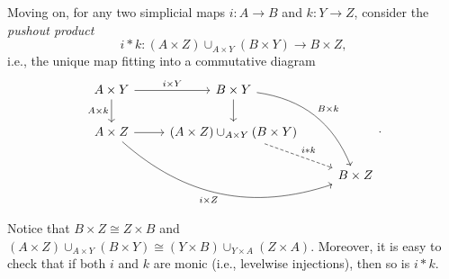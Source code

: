 \documentclass[10pt,letterpaper,cm]{nupset}
\theoremstyle{definition}
\theoremstyle{theorem}
\theoremstyle{remark}
\newcommand{\0}{\mathbf{0}}
\newcommand{\1}{\mathbf{1}}
\newcommand{\2}{\mathbf{2}}
\begin{document}
Moving on, for any two simplicial maps $i : A \to B$ and $k : Y \to Z$, consider the \textit{pushout product} 
\[
i \mathbin{\ast} k  : \left(A \times Z\right) \cup_{A\times Y} \left(B \times Y \right) \to B \times Z,
\] i.e., the unique map fitting into a commutative diagram
\[
\begin{tikzcd}
A\times Y \arrow[d, "A\times k"'] \arrow[r, "i\times Y"]  & B\times Y \arrow[d] \arrow[rdd, "B\times k", bend left]                                                   &           \\
A\times Z \arrow[r] \arrow[rrd, "i\times Z"', bend right] &  \left(A \times Z\right) \cup_{A\times Y} \left(B \times Y \right) \arrow[rd, "i\mathbin{\ast}k", dashed] &           \\
                                                          &                                                                                                           & B\times Z
\end{tikzcd}
.\]
Notice that $B\times Z \cong Z \times B$ and $\left(A \times Z\right) \cup_{A\times Y} \left(B \times Y \right) \cong \left(Y \times B\right) \cup_{Y\times A} \left(Z \times A\right)$. Moreover, it is easy to check that if both $i$ and $k$ are monic (i.e., levelwise injections), then so is $i \mathbin{\ast} k$.
\end{document}
